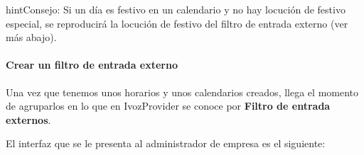 \documentclass[letterpaper,10pt,spanish]{sphinxmanual}
\begin{document}
\begin{notice}{hint}{Consejo:}
Si un día es festivo en un calendario y no hay locución de festivo especial, se reproducirá la locución de festivo del filtro de entrada externo (ver más abajo).
\end{notice}
\paragraph{Crear un filtro de entrada externo}

Una vez que tenemos unos horarios y unos calendarios creados, llega el momento de agruparlos en lo que en IvozProvider se conoce por \textbf{Filtro de entrada externos}.

El interfaz que se le presenta al administrador de empresa es el siguiente:

\noindent{}
\end{document}
